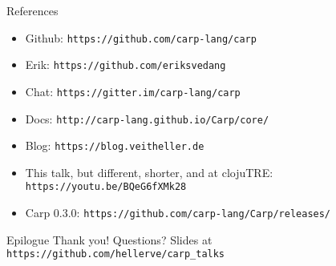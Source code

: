 \documentclass[14pt,aspectratio=169]{beamer}
\begin{document}
  \begin{frame}{References}
    \begin{itemize}
      \item Github: \texttt{https://github.com/carp-lang/carp}
      \item Erik: \texttt{https://github.com/eriksvedang}
      \item Chat: \texttt{https://gitter.im/carp-lang/carp}
      \item Docs: \texttt{http://carp-lang.github.io/Carp/core/}
      \item Blog: \texttt{https://blog.veitheller.de}
      \item This talk, but different, shorter, and at clojuTRE: \texttt{https://youtu.be/BQeG6fXMk28}
      \item Carp 0.3.0: \texttt{https://github.com/carp-lang/Carp/releases/}
    \end{itemize}
  \end{frame}
  \begin{frame}{Epilogue}
    \Huge Thank you!
    \linebreak
    \linebreak
    \linebreak
    \small Questions?
    \linebreak
    \linebreak
    \tiny Slides at \texttt{https://github.com/hellerve/carp\_talks}
  \end{frame}
\end{document}
